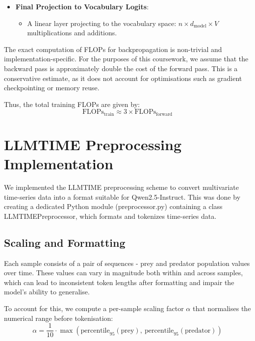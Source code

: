 \documentclass[a4paper,12pt]{article}
\begin{document}
\begin{itemize}
  \item \textbf{Final Projection to Vocabulary Logits}:
  \begin{itemize}
    \item A linear layer projecting to the vocabulary space: $n \times d_{\text{model}} \times V$ multiplications and additions.
  \end{itemize}
\end{itemize}

The exact computation of FLOPs for backpropagation is non-trivial and implementation-specific. For the purposes of this coursework, we assume that the backward pass is approximately double the cost of the forward pass. This is a conservative estimate, as it does not account for optimisations such as gradient checkpointing or memory reuse.

Thus, the total training FLOPs are given by:
\begin{equation}
\text{FLOPs}_{\text{train}} \approx 3 \times \text{FLOPs}_{\text{forward}}
\end{equation}

\section{LLMTIME Preprocessing Implementation}

We implemented the LLMTIME preprocessing scheme \citep{gruver2023language} to convert multivariate time-series data into a format suitable for Qwen2.5-Instruct. This was done by creating a dedicated Python module (preprocessor.py) containing a class LLMTIMEPreprocessor, which formats and tokenizes time-series data.

\subsection*{Scaling and Formatting}

Each sample consists of a pair of sequences - prey and predator population values over time. These values can vary in magnitude both within and across samples, which can lead to inconsistent token lengths after formatting and impair the model’s ability to generalise.

To account for this, we compute a per-sample scaling factor $\alpha$ that normalises the numerical range before tokenisation:
\begin{equation}
\alpha = \frac{1}{10} \cdot \max\left(\text{percentile}_{95}(\text{prey}),\ \text{percentile}_{95}(\text{predator})\right)
\end{equation}
\end{document}
